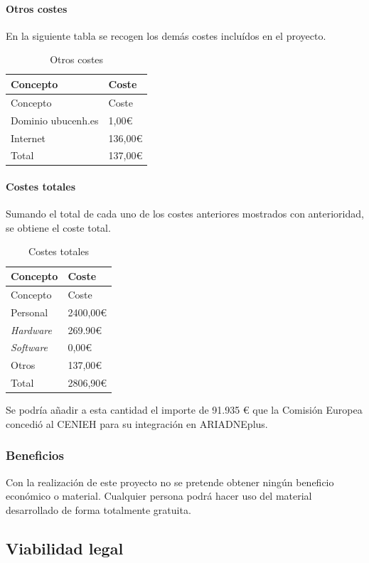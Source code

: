 \documentclass[
]{article}
\begin{document}
\hypertarget{otros-costes}{%
\paragraph{Otros costes}\label{otros-costes}}

En la siguiente tabla se recogen los demás costes incluídos en el
proyecto.

\begin{longtable}[]{@{}ll@{}}
\caption{Otros costes}\tabularnewline
\toprule
Concepto & Coste\tabularnewline
\midrule
\endfirsthead
\toprule
Concepto & Coste\tabularnewline
\midrule
\endhead
Dominio ubucenh.es & 1,00€\tabularnewline
Internet & 136,00€\tabularnewline
Total & 137,00€\tabularnewline
\bottomrule
\end{longtable}

\hypertarget{costes-totales}{%
\paragraph{Costes totales}\label{costes-totales}}

Sumando el total de cada uno de los costes anteriores mostrados con
anterioridad, se obtiene el coste total.

\begin{longtable}[]{@{}ll@{}}
\caption{Costes totales}\tabularnewline
\toprule
Concepto & Coste\tabularnewline
\midrule
\endfirsthead
\toprule
Concepto & Coste\tabularnewline
\midrule
\endhead
Personal & 2400,00€\tabularnewline
\emph{Hardware} & 269.90€\tabularnewline
\emph{Software} & 0,00€\tabularnewline
Otros & 137,00€\tabularnewline
Total & 2806,90€\tabularnewline
\bottomrule
\end{longtable}

Se podría añadir a esta cantidad el importe de 91.935 € que la Comisión
Europea concedió al CENIEH para su integración en ARIADNEplus.

\hypertarget{beneficios}{%
\subsubsection{Beneficios}\label{beneficios}}

Con la realización de este proyecto no se pretende obtener ningún
beneficio económico o material. Cualquier persona podrá hacer uso del
material desarrollado de forma totalmente gratuita.

\hypertarget{viabilidad-legal}{%
\subsection{Viabilidad legal}\label{viabilidad-legal}}
\end{document}
